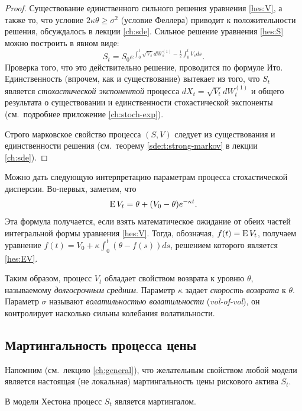 \begin{proof}
Существование единственного сильного решения уравнения \eqref{hes:V}, а также то, что условие $2\kappa\theta\ge\sigma^2$ (условие Феллера) приводит к положительности решения, обсуждалось в лекции \ref{ch:sde}.
Сильное решение уравнения \eqref{hes:S} можно построить в явном виде:
\[
S_t = S_0 e^{\int_0^t \sqrt{V_s} dW_s^{(1)}  - \frac12 \int_0^t V_s ds}.
\]
Проверка того, что это действительно решение, проводится по формуле Ито.
Единственность (впрочем, как и существование) вытекает из того, что $S_t$ является \emph{стохастической экспонентой} процесса $d X_t = \sqrt{V_t} dW_t^{(1)}$ и общего результата о существовании и единственности стохастической экспоненты (см.~подробнее приложение \ref{ch:stoch-exp}).

Строго марковское свойство процесса $(S,V)$ следует из существования и единственности решения (см.~теорему \ref{sde:t:strong-markov} в лекции \ref{ch:sde}).
\end{proof}

Можно дать следующую интерпретацию параметрам процесса стохастической дисперсии.
Во-первых, заметим, что
\begin{equation}
\label{hes:EV}  
\operatorname{E} V_t = \theta + (V_0 - \theta)e^{-\kappa t}.
\end{equation}
Эта формула получается, если взять математическое ожидание от обеих частей интегральной формы уравнения \eqref{hes:V}.
Тогда, обозначая, $f(t) = \operatorname{E} V_t$, получаем уравнение $f(t) = V_0 + \kappa\int_0^t (\theta - f(s))ds$, решением которого является \eqref{hes:EV}.

Таким образом, процесс $V_t$ обладает свойством возврата к уровню $\theta$, называемому \emph{долгосрочным средним}.
Параметр $\kappa$ задает \emph{скорость возврата} к $\theta$.
Параметр $\sigma$ называют \emph{волатильностью волатильности} (\emph{vol-of-vol}), он контролирует насколько сильны колебания волатильности.


\subsection{Мартингальность процесса цены \difficult}

Напомним (см.~лекцию \ref{ch:general}), что желательным свойством любой модели является настоящая (не локальная) мартингальность цены рискового актива $S_t$.

\begin{proposition}
\label{hes:p:price-martingale}
В модели Хестона процесс $S_t$ является мартингалом.
\end{proposition}

